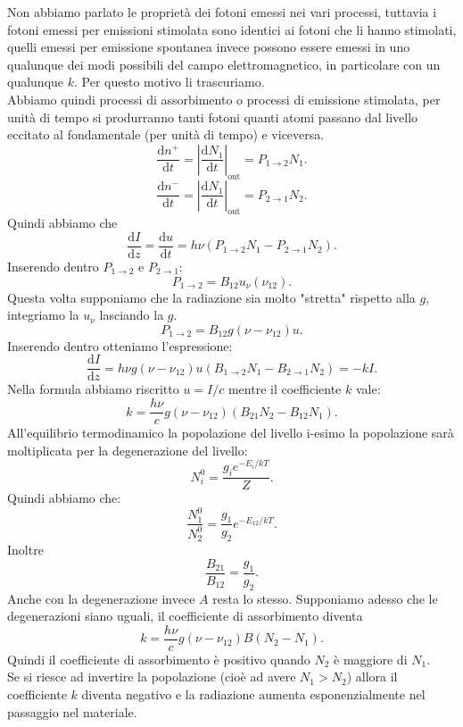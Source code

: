 Non abbiamo parlato le proprietà dei fotoni emessi nei vari processi, tuttavia i fotoni emessi per emissioni stimolata sono identici ai fotoni che li hanno stimolati, quelli emessi per emissione spontanea invece possono essere emessi in uno qualunque dei modi possibili del campo elettromagnetico, in particolare con un qualunque $k$. Per questo motivo li trascuriamo.\\
Abbiamo quindi processi di assorbimento o processi di emissione stimolata, per unità di tempo si produrranno tanti fotoni quanti atomi passano dal livello eccitato al fondamentale (per unità di tempo) e viceversa.
\[
\frac{\text{d} n^+}{\text{d} t} = \left|\frac{\text{d} N_1}{\text{d} t} \right|_\text{out} 
= P_{1\to 2}N_1
.\] 
\[
\frac{\text{d} n^-}{\text{d} t} =\left|\frac{\text{d} N_1}{\text{d} t} \right|_\text{out} = P_{2\to 1}N_2
.\] 
Quindi abbiamo che 
\[
\frac{\text{d} I}{\text{d} z} = \frac{\text{d} u}{\text{d} t} =
h\nu \left(P_{1\to 2}N_1 - P_{2\to 1}N_2\right)
.\] 
Inserendo dentro $P_{1\to 2}$  e $P_{2\to 1}$:
\[
    P_{1 \to 2} = B_{12}u_\nu (\nu_{12}) 
.\] 
Questa volta supponiamo che la radiazione sia molto "stretta" rispetto alla $g$, integriamo la $u_\nu$  lasciando la $g$.  \\
\[
    P_{1 \to 2} = B_{12}g(\nu-\nu_{12})u
.\] 
Inserendo dentro otteniamo l'espressione:
\[
    \frac{\text{d} I}{\text{d} z} = h\nu g(\nu-\nu_{12}) u\left(B_{1\to 2}N_1
    -B_{2\to 1}N_2\right)= -kI
.\] 
Nella formula abbiamo riscritto $u = I /c$  mentre il coefficiente $k$  vale:
\[
    k=\frac{h\nu}{c}g(\nu-\nu_{12})\left(B_{21}N_2 - B_{12}N_1\right) 
.\] 
All'equilibrio termodinamico la popolazione del livello i-esimo la popolazione sarà moltiplicata per la degenerazione del livello:
\[
N_i^0 = \frac{g_i e^{- E_i /kT}}{Z}
.\] 
Quindi abbiamo che:
\[
\frac{N_1^0}{N_2^0} = \frac{g_1}{g_2}e^{-E_{12} /kT}
.\] 
Inoltre
\[
\frac{B_{21}}{B_{12}} = \frac{g_1}{g_2}
.\] 
Anche con la degenerazione invece $A$ resta lo stesso. Supponiamo adesso che le degenerazioni siano uguali, il coefficiente di assorbimento diventa
\[
    k=\frac{h\nu}{c}g(\nu-\nu_{12}) B(N_2-N_1) 
.\] 
Quindi il coefficiente di assorbimento è positivo quando $N_2$ è maggiore di $N_1$. \\
Se si riesce ad invertire la popolazione (cioè ad avere $N_1>N_2$) allora il coefficiente $k$ diventa negativo e la radiazione aumenta esponenzialmente nel passaggio nel materiale. 
